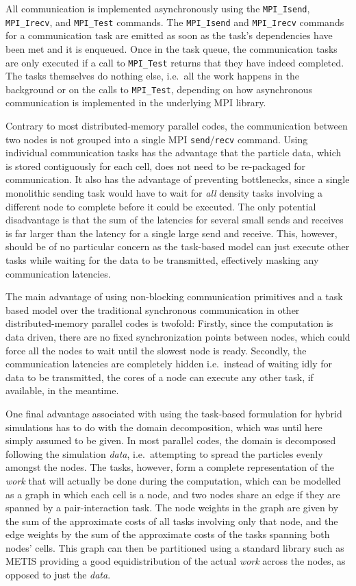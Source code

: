 \documentclass[final]{siamltex}
\begin{document}
All communication is implemented asynchronously using the
{\tt MPI\_Isend}, {\tt MPI\_Irecv}, and {\tt MPI\_Test}
commands.
The {\tt MPI\_Isend} and {\tt MPI\_Irecv} commands for a
communication task are emitted as soon as the task's dependencies
have been met and it is enqueued.
Once in the task queue, the communication tasks are only executed
if a call to {\tt MPI\_Test} returns that they have indeed completed.
The tasks themselves do nothing else, i.e.~all the work happens
in the background or on the calls to {\tt MPI\_Test}, depending
on how asynchronous communication is implemented in the
underlying MPI library.

Contrary to most distributed-memory parallel codes, the
communication between two nodes is not grouped into a single
MPI {\tt send}/{\tt recv} command.
Using individual communication tasks has the advantage that
the particle data, which is stored contiguously for each
cell, does not need to be re-packaged for communication.
It also has the advantage of preventing bottlenecks, since
a single monolithic sending task would have to wait for {\em all} density
tasks involving a different node to complete before it
could be executed.
The only potential disadvantage is that the sum of the latencies
for several small sends and receives is far larger than the
latency for a single large send and receive.
This, however, should be of no particular concern as the task-based
model can just execute other tasks while waiting for the
data to be transmitted, effectively masking any communication latencies.

The main advantage of using non-blocking communication primitives
and a task based model over the traditional
synchronous communication in other distributed-memory parallel codes
is twofold: Firstly, since the computation is data driven,
there are no fixed synchronization points between
nodes, which could force all the nodes to wait
until the slowest node is ready.
Secondly, the communication latencies are completely hidden
i.e.~instead of waiting idly for data to be transmitted, the cores of
a node can execute any other task, if available, in the meantime.

One final advantage associated with using the task-based formulation for
hybrid simulations has to do with the domain decomposition, which
was until here simply assumed to be given.
In most parallel codes, the domain is decomposed following the
simulation {\em data}, i.e.~attempting to spread the particles
evenly amongst the nodes.
The tasks, however, form a complete representation of the {\em work}
that will actually be done during the computation, which can be modelled
as a graph in which each cell is a node, and two nodes share an edge if
they are spanned by a pair-interaction task.
The node weights in the graph are given by the sum of the approximate costs
of all tasks involving only that node, and the edge weights by the
sum of the approximate costs of the tasks spanning both nodes' cells.
This graph can then be partitioned using a standard library
such as METIS \cite{ref:Karypis1998} providing a good equidistribution
of the actual {\em work} across the nodes, as opposed to just
the {\em data}.
\end{document}
